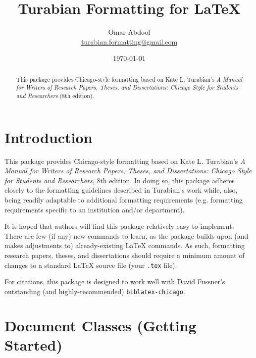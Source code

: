 \documentclass{article}
\title{Turabian Formatting for \LaTeX{}}
\author{Omar Abdool \\
{\normalsize \href{mailto:turabian.formatting@gmail.com}{turabian.formatting@gmail.com}}}
\date{\today}
\begin{document}
\maketitle

\renewcommand{\abstractname}{}

\begin{abstract}
\vspace{-\baselineskip}
\noindent This package provides Chicago-style formatting based on Kate L. Turabian's \emph{A Manual for Writers of Research Papers, Theses, and Dissertations: Chicago Style for Students and Researchers} (8th edition).
\end{abstract}


\tableofcontents



\reversemarginpar
\setlength\parindent{0in}
\setlength\parskip{1\baselineskip}



\section*{Introduction}
\label{sec:introduction}


This package provides Chicago-style formatting based on Kate L. Turabian's \emph{A Manual for Writers of Research Papers, Theses, and Dissertations: Chicago Style for Students and Researchers}, 8th edition. In doing so, this package adheres closely to the formatting guidelines described in Turabian's work while, also, being readily adaptable to additional formatting requirements (e.g. formatting requirements specific to an institution and/or department).

It is hoped that authors will find this package relatively easy to implement. There are few (if any) new commands to learn, as the package builds upon (and makes adjustments to) already-existing \LaTeX{} commands. As such, formatting research papers, theses, and dissertations should require a minimum amount of changes to a standard \LaTeX{} source file (your \texttt{.tex} file).

For citations, this package is designed to work well with David Fussner's outstanding (and highly-recommended) \texttt{biblatex-chicago}.


\clearpage
\section{Document Classes (Getting Started)}
\label{sec:implementation}
\end{document}
